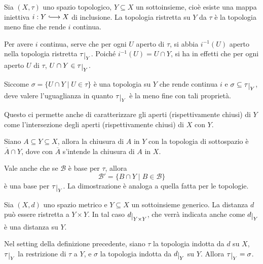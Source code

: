 \begin{defn}
    Sia $(X, \tau)$ uno spazio topologico, $Y \subseteq X$ un sottoinsieme,
    cio\`e esiste una mappa iniettiva $i: Y \hooklongrightarrow X$ di
    inclusione. La topologia ristretta su $Y$ da $\tau$ \`e la topologia meno
    fine che rende $i$ continua.
\end{defn}

\begin{oss}
    Per avere $i$ continua, serve che per ogni $U$ aperto di $\tau$, si abbia
    $i^{-1}(U)$ aperto nella topologia ristretta $\tau \restrict{Y}$. Poiché
    $i^{-1}(U) = U \cap Y$, si ha in effetti che per ogni aperto $U$ di $\tau$,
    $U \cap Y \in \tau \restrict{Y}$.

    Siccome $\sigma = \{U \cap Y \;|\; U \in \tau\}$ \`e una topologia su $Y$
    che rende continua $i$ e $\sigma \subseteq \tau\restrict{Y}$, deve valere
    l'uguaglianza in quanto $\tau\restrict{Y}$ \`e la meno fine con tali
    proprietà.

    Questo ci permette anche di caratterizzare gli aperti (rispettivamente chiusi) di $Y$ come l'intersezione degli aperti (rispettivamente chiusi) di $X$ con $Y$.
\end{oss}

\begin{exc}
  Siano $A \subseteq Y \subseteq X$, allora la chiusura di $A$ in $Y$ con la topologia di sottospazio è $\overline{A} \cap Y$, dove con $\overline{A}$ s'intende la chiusura di $A$ in $X$.
\end{exc}

\begin{oss}
    Vale anche che se $\mathcal{B}$ \`e base per $\tau$, allora
    \[
    \mathcal{B'} = \{B \cap Y \;|\; B \in \mathcal{B}\}
    \]
    \`e una base per $\tau\restrict{Y}$. La dimostrazione \`e analoga a quella
    fatta per le topologie.
\end{oss}

\begin{defn}
    Sia $(X, d)$ uno spazio metrico e $Y \subseteq X$ un sottoinsieme generico.
    La distanza $d$ pu\`o essere ristretta a $Y \times Y$. In tal caso
    $d\restrict{Y \times Y}$, che verr\`a indicata anche come $d\restrict{Y}$
    \`e una distanza su $Y$.
\end{defn}

\begin{prop}
    Nel setting della definizione precedente, siano $\tau$ la topologia indotta
    da $d$ su $X$, $\tau\restrict{Y}$ la restrizione di $\tau$ a $Y$, e $\sigma$
    la topologia indotta da $d\restrict{Y}$ su $Y$. Allora $\tau\restrict{Y} =
    \sigma$.
\end{prop}


